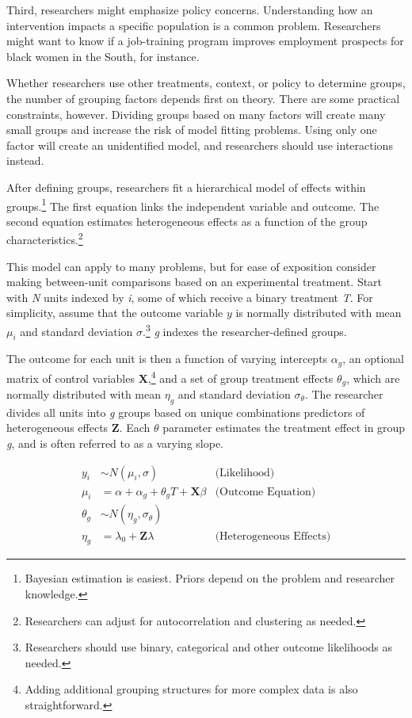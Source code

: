 \documentclass[12pt]{article}
\begin{document}
Third, researchers might emphasize policy concerns.
Understanding how an intervention impacts a specific population is a common problem.
Researchers might want to know if a job-training program improves employment prospects for black women in the South, for instance.  


Whether researchers use other treatments, context, or policy to determine groups, the number of grouping factors depends first on theory.
There are some practical constraints, however.
Dividing groups based on many factors will create many small groups and increase the risk of model fitting problems. 
Using only one factor will create an unidentified model, and researchers should use interactions instead. 


After defining groups, researchers fit a hierarchical model of effects within groups.\footnote{Bayesian estimation is easiest. Priors depend on the problem and researcher knowledge.} 
The first equation links the independent variable and outcome. 
The second equation estimates heterogeneous effects as a function of the group characteristics.\footnote{Researchers can adjust for autocorrelation and clustering as needed.}  


This model can apply to many problems, but for ease of exposition consider making between-unit comparisons based on an experimental treatment.    
Start with \textit{N} units indexed by \textit{i}, some of which receive a binary treatment \textit{T}.
For simplicity, assume that the outcome variable ${y}$ is normally distributed with mean $\mu_i$ and standard deviation $\sigma$.\footnote{Researchers should use binary, categorical and other outcome likelihoods as needed.}
\textit{g} indexes the researcher-defined groups. 


The outcome for each unit is then a function of varying intercepts $\alpha_g$, an optional matrix of control variables \textbf{X},\footnote{Adding additional grouping structures for more complex data is also straightforward.} and a set of group treatment effects $\theta_g$, which are normally distributed with mean $\eta_g$ and standard deviation $\sigma_\theta$. 
The researcher divides all units into \textit{g} groups based on unique combinations predictors of heterogeneous effects \textbf{Z}. 
Each $\theta$ parameter estimates the treatment effect in group \textit{g}, and is often referred to as a varying slope. 


\begin{equation}
\begin{aligned}
y_i &\sim N(\mu_i, \sigma) &\text{(Likelihood)} \\
\mu_i &= \alpha + \alpha_g + \theta_g \textit{T} + \textbf{X} \beta &\text{(Outcome Equation)}  \\
\theta_g &\sim N(\eta_g, \sigma_\theta) \\ 
\eta_g &= \lambda_0 + \textbf{Z} \lambda &\text{(Heterogeneous Effects)} 
\end{aligned}
\end{equation}
\end{document}
